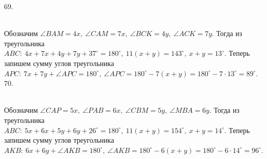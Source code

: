 \documentclass[12pt]{article}
\begin{document}
69. \begin{figure}[ht!]
\end{figure}\\
Обозначим $\angle BAM=4x,\ \angle CAM=7x,\ \angle BCK=4y,\ \angle ACK=7y.$ Тогда из треугольника $ABC:\ 4x+7x+4y+7y+37^\circ=180^\circ,\ 11(x+y)=143^\circ,\ x+y=13^\circ.$ Теперь запишем сумму углов треугольника $APC:\ 7x+7y+\angle APC=180^\circ,\ \angle APC=180^\circ-7(x+y)=180^\circ-7\cdot13^\circ=89^\circ.$\\
70. \begin{figure}[ht!]
\end{figure}\\
Обозначим $\angle CAP=5x,\ \angle PAB=6x,\ \angle CBM=5y,\ \angle MBA=6y.$ Тогда из треугольника $ABC:\ 5x+6x+5y+6y+26^\circ=180^\circ,\ 11(x+y)=154^\circ,\ x+y=14^\circ.$ Теперь запишем сумму углов треугольника $AKB:\ 6x+6y+\angle AKB=180^\circ,\ \angle AKB=180^\circ-6(x+y)=180^\circ-6\cdot14^\circ=96^\circ.$\\
\end{document}
